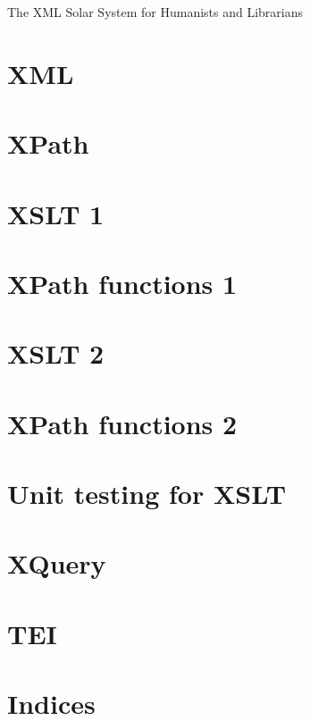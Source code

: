 \documentclass[open=any, index=totoc, paper=167mm:239mm]{scrbook}
\begin{document}
  \frontmatter  
    \thispagestyle{empty}
    \vspace*{\fill}
    \begin{center}The XML Solar System for Humanists and Librarians\end{center}
    \vspace*{\fill}

    \tableofcontents

  \mainmatter
    \part{XML}
    

    \part{XPath}

    \part{XSLT 1}

    \part{XPath functions 1}

    \part{XSLT 2}

    \part{XPath functions 2}

    \part{Unit testing for XSLT}

    \part{XQuery}

    \part{TEI}

  \backmatter
    \part{Indices}
    
    \clearpage
    \printindex*
\end{document}
